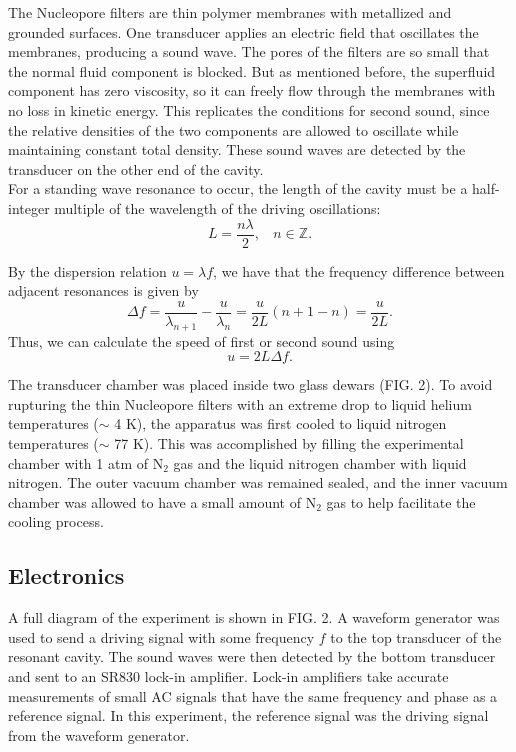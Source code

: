 \documentclass[prb,aps,twocolumn,showpacs,10pt]{revtex4-1}
\begin{document}
The Nucleopore filters are thin polymer membranes with metallized and grounded surfaces. One transducer applies an electric field that oscillates the membranes, producing a sound wave. The pores of the filters are so small that the normal fluid component is blocked. But as mentioned before, the superfluid component has zero viscosity, so it can freely flow through the membranes with no loss in kinetic energy. This replicates the conditions for second sound, since the relative densities of the two components are allowed to oscillate while maintaining constant total density. These sound waves are detected by the transducer on the other end of the cavity.\\

For a standing wave resonance to occur, the length of the cavity must be a half-integer multiple of the wavelength of the driving oscillations\cite{phy}:
\begin{equation}
L=\frac{n \lambda}{2}, \ \ \ \ n \in \mathbb{Z}.
\end{equation}

\noindent By the dispersion relation $u = \lambda f$, we have that the frequency difference between adjacent resonances is given by
\begin{equation}
\Delta f = \frac{u}{\lambda_{n+1}} - \frac{u}{\lambda_n} = \frac{u}{2L}( n+1-n )= \frac{u}{2L}.
\end{equation}
Thus, we can calculate the speed of first or second sound using
\begin{equation}
u = 2L\Delta f.
\end{equation}

The transducer chamber was placed inside two glass dewars (FIG. 2). To avoid rupturing the thin Nucleopore filters with an extreme drop to liquid helium temperatures ($\sim$ 4 K), the apparatus was first cooled to liquid nitrogen temperatures ($\sim$ 77 K). This was accomplished by filling the experimental chamber with 1 atm of N$_2$ gas and the liquid nitrogen chamber with liquid nitrogen. The outer vacuum chamber was remained sealed, and the inner vacuum chamber was allowed to have a small amount of N$_2$ gas to help facilitate the cooling process. 

\subsection{Electronics}

A full diagram of the experiment is shown in FIG. 2. A waveform generator was used to send a driving signal with some frequency $f$ to the top transducer of the resonant cavity. The sound waves were then detected by the bottom transducer and sent to an SR830 lock-in amplifier. Lock-in amplifiers take accurate measurements of small AC signals that have the same frequency and phase as a reference signal. In this experiment, the reference signal was the driving signal from the waveform generator.\\
\end{document}
